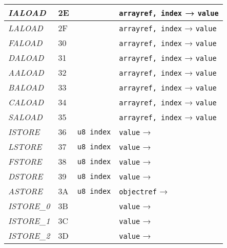 \begin{center}
\begin{longtable}{ | p{} | p{} | p{} | p{} | }
        \emph{IALOAD}
		& 2E & & \lstinline|arrayref, index| → \lstinline|value|
		\\ \hline

        \emph{LALOAD}
		& 2F & & \lstinline|arrayref, index| → \lstinline|value|
		\\ \hline

        \emph{FALOAD}
		& 30 & & \lstinline|arrayref, index| → \lstinline|value|
		\\ \hline

        \emph{DALOAD}
		& 31 & & \lstinline|arrayref, index| → \lstinline|value|
		\\ \hline
        
        \emph{AALOAD}
		& 32 & & \lstinline|arrayref, index| → \lstinline|value|
		\\ \hline

        \emph{BALOAD}
		& 33 & & \lstinline|arrayref, index| → \lstinline|value|
		\\ \hline

        \emph{CALOAD}
		& 34 & & \lstinline|arrayref, index| → \lstinline|value|
		\\ \hline

        \emph{SALOAD}
		& 35 & & \lstinline|arrayref, index| → \lstinline|value|
		\\ \hline

        \emph{ISTORE}
		& 36 & \lstinline|u8 index| & \lstinline|value| →
		\\ \hline

        \emph{LSTORE}
		& 37 & \lstinline|u8 index| & \lstinline|value| →
		\\ \hline

        \emph{FSTORE}
		& 38 & \lstinline|u8 index| & \lstinline|value| →
		\\ \hline

        \emph{DSTORE}
		& 39 & \lstinline|u8 index| & \lstinline|value| →
		\\ \hline
        
        \emph{ASTORE}
		& 3A & \lstinline|u8 index| & \lstinline|objectref| →
		\\ \hline

        \emph{ISTORE\_0}
		& 3B & & \lstinline|value| →
		\\ \hline

        \emph{ISTORE\_1}
		& 3C & & \lstinline|value| →
		\\ \hline

        \emph{ISTORE\_2}
		& 3D & & \lstinline|value| →
		\\ \hline


\end{longtable}
\end{center}
